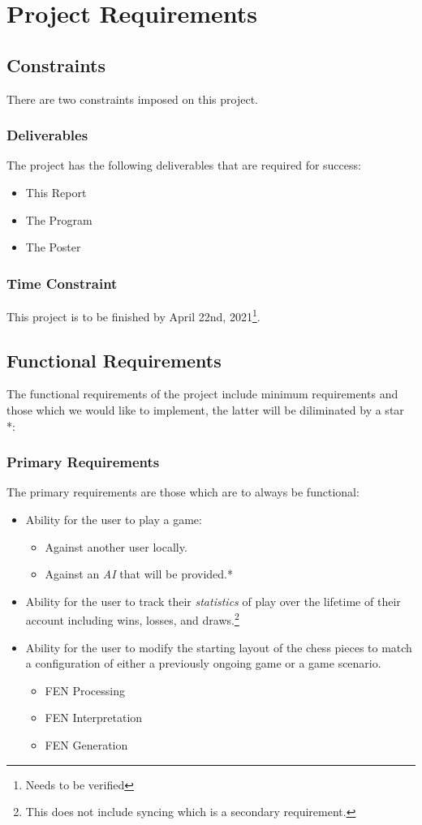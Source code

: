 
	
\section{Project Requirements}
	\subsection{Constraints}
	There are two constraints imposed on this project.
	\subsubsection{Deliverables}
	The project has the following deliverables that are required for success:
	\begin{itemize}
		\item This Report
		\item The Program
		\item The Poster
	\end{itemize}
	\subsubsection{Time Constraint}
	This project is to be finished by April 22nd, 2021\footnote{Needs to be verified}.
	
	\subsection{Functional Requirements}
	The functional requirements of the project include minimum requirements and those which we would like to implement, the latter will be diliminated by a star *:
	\subsubsection{Primary Requirements}
	The primary requirements are those which are to always be functional:
	\begin{itemize}
		\item Ability for the user to play a game:
		\begin{itemize}
			\item Against another user locally.
			\item Against an \emph{AI} that will be provided.*
		\end{itemize}
	\item Ability for the user to track their \emph{statistics} of play over the lifetime of their account including wins, losses, and draws.\footnote{This does not include syncing which is a secondary requirement.}
	\item Ability for the user to modify the starting layout of the chess pieces to match a configuration of either a previously ongoing game or a game scenario. 
	\begin{itemize}
		\item FEN Processing
		\item FEN Interpretation
		\item FEN Generation
	\end{itemize}
	\end{itemize}
